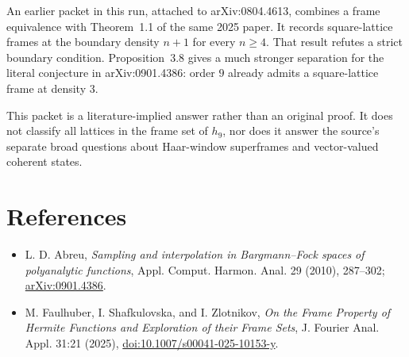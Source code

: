 \documentclass[11pt]{article}
\begin{document}
An earlier packet in this run, attached to arXiv:0804.4613, combines a frame
equivalence with Theorem~1.1 of the same 2025 paper.  It records square-lattice
frames at the boundary density $n+1$ for every $n\ge4$.  That result refutes a
strict boundary condition.  Proposition~3.8 gives a much stronger separation
for the literal conjecture in arXiv:0901.4386: order $9$ already admits a
square-lattice frame at density $3$.

This packet is a literature-implied answer rather than an original proof.  It
does not classify all lattices in the frame set of $h_9$, nor does it answer
the source's separate broad questions about Haar-window superframes and
vector-valued coherent states.

\section{References}

\begin{itemize}[leftmargin=*]
\item L. D. Abreu, \emph{Sampling and interpolation in Bargmann--Fock spaces
of polyanalytic functions}, Appl. Comput. Harmon. Anal. 29 (2010), 287--302;
\href{https://arxiv.org/abs/0901.4386}{arXiv:0901.4386}.
\item M. Faulhuber, I. Shafkulovska, and I. Zlotnikov, \emph{On the Frame
Property of Hermite Functions and Exploration of their Frame Sets}, J.
Fourier Anal. Appl. 31:21 (2025),
\href{https://doi.org/10.1007/s00041-025-10153-y}{doi:10.1007/s00041-025-10153-y}.
\end{itemize}
\end{document}
